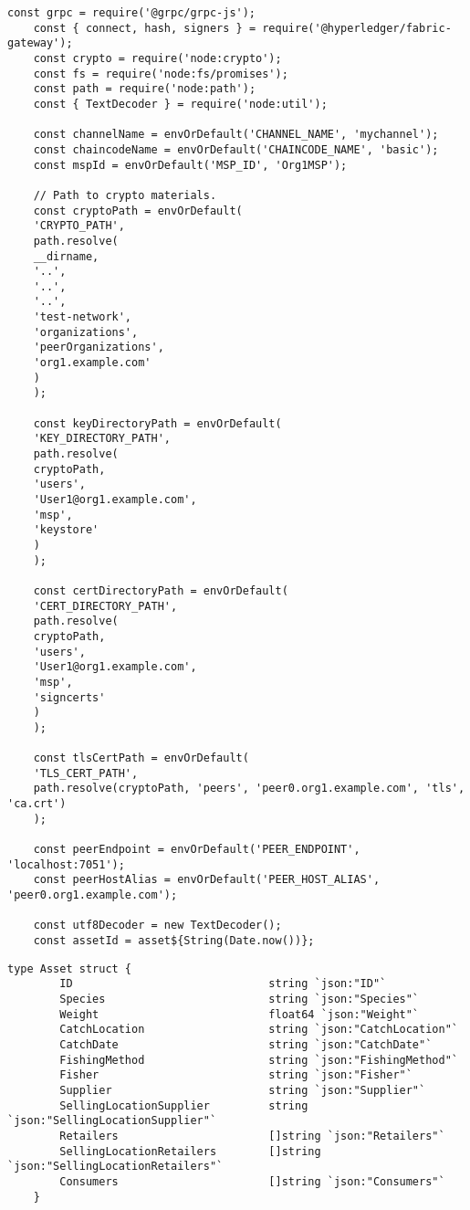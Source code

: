 \begin{lstlisting}[style=customjs, caption={Node.js configuration for Hyperledger Fabric Gateway}]
	const grpc = require('@grpc/grpc-js');
	const { connect, hash, signers } = require('@hyperledger/fabric-gateway');
	const crypto = require('node:crypto');
	const fs = require('node:fs/promises');
	const path = require('node:path');
	const { TextDecoder } = require('node:util');
	
	const channelName = envOrDefault('CHANNEL_NAME', 'mychannel');
	const chaincodeName = envOrDefault('CHAINCODE_NAME', 'basic');
	const mspId = envOrDefault('MSP_ID', 'Org1MSP');
	
	// Path to crypto materials.
	const cryptoPath = envOrDefault(
	'CRYPTO_PATH',
	path.resolve(
	__dirname,
	'..',
	'..',
	'..',
	'test-network',
	'organizations',
	'peerOrganizations',
	'org1.example.com'
	)
	);
	
	const keyDirectoryPath = envOrDefault(
	'KEY_DIRECTORY_PATH',
	path.resolve(
	cryptoPath,
	'users',
	'User1@org1.example.com',
	'msp',
	'keystore'
	)
	);
	
	const certDirectoryPath = envOrDefault(
	'CERT_DIRECTORY_PATH',
	path.resolve(
	cryptoPath,
	'users',
	'User1@org1.example.com',
	'msp',
	'signcerts'
	)
	);
	
	const tlsCertPath = envOrDefault(
	'TLS_CERT_PATH',
	path.resolve(cryptoPath, 'peers', 'peer0.org1.example.com', 'tls', 'ca.crt')
	);
	
	const peerEndpoint = envOrDefault('PEER_ENDPOINT', 'localhost:7051');
	const peerHostAlias = envOrDefault('PEER_HOST_ALIAS', 'peer0.org1.example.com');
	
	const utf8Decoder = new TextDecoder();
	const assetId = asset${String(Date.now())};
\end{lstlisting}


\begin{lstlisting}[style=customjs, caption={Asset Data Structure}, label={lst:asset-struct}]
	type Asset struct {
		ID             					string `json:"ID"`
		Species							string `json:"Species"`
		Weight							float64 `json:"Weight"`
		CatchLocation					string `json:"CatchLocation"`
		CatchDate						string `json:"CatchDate"`
		FishingMethod					string `json:"FishingMethod"`   
		Fisher							string `json:"Fisher"`
		Supplier						string `json:"Supplier"`
		SellingLocationSupplier			string `json:"SellingLocationSupplier"`
		Retailers						[]string `json:"Retailers"`
		SellingLocationRetailers		[]string `json:"SellingLocationRetailers"`
		Consumers						[]string `json:"Consumers"`
	}
\end{lstlisting}

